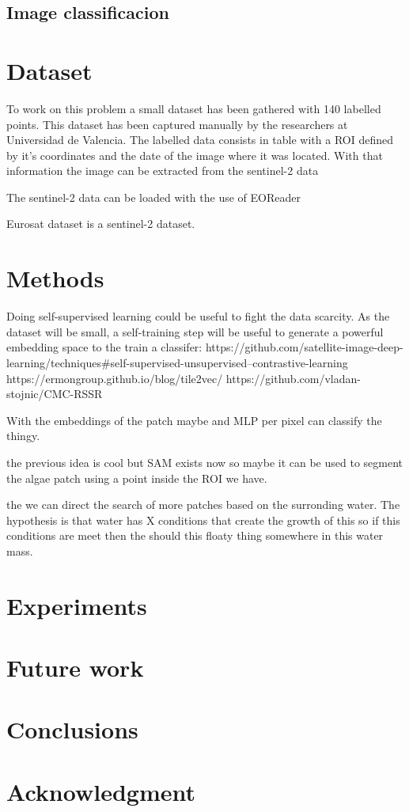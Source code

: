 \documentclass[conference]{IEEEtran}
\begin{document}
    \subsection{Image classificacion}


    \section{Dataset}
    To work on this problem a small dataset has been gathered with 140 labelled points.
    This dataset has been captured manually by the researchers at Universidad de Valencia.
    The labelled data consists in table with a ROI defined by it's coordinates and the date
    of the image where it was located.
    With that information the image can be extracted from the sentinel-2 data

    The sentinel-2 data can be loaded with the use of EOReader\cite{eoreader_paper}

    Eurosat dataset\cite{helber2019eurosat} is a sentinel-2 dataset.


    \section{Methods}



    Doing self-supervised learning could be useful to fight the data scarcity.\cite{OKELLY1987393}
    As the dataset will be small, a self-training step will be useful to generate
    a powerful embedding space to the train a classifer:
    https://github.com/satellite-image-deep-learning/techniques#self-supervised-unsupervised--contrastive-learning
    https://ermongroup.github.io/blog/tile2vec/
    https://github.com/vladan-stojnic/CMC-RSSR

    With the embeddings of the patch maybe and MLP per pixel can classify the thingy.


    the previous idea is cool but SAM exists now so maybe it can be used to segment the algae patch
    using a point inside the ROI we have.

    the we can direct the search of more patches based on the surronding water.
    The hypothesis is that water has X conditions that create the growth of this so if this conditions
    are meet then the should this floaty thing somewhere in this water mass.


    \section{Experiments}


    \section{Future work}


    \section{Conclusions}

    \section*{Acknowledgment}

    
    
\end{document}
